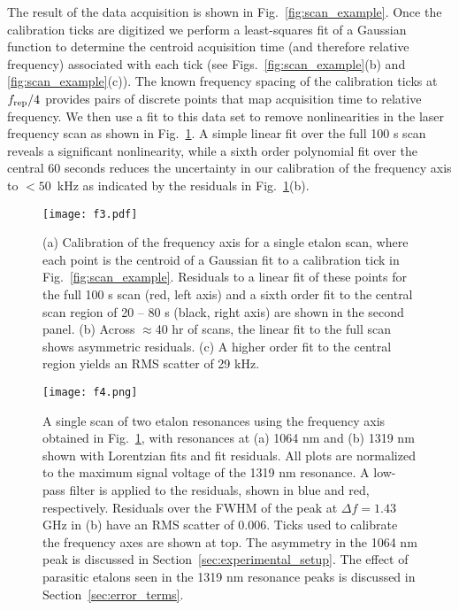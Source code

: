 \documentclass[10pt]{article}
\begin{document}
The result of the data acquisition is shown in Fig.~\ref{fig:scan_example}. Once the calibration ticks are digitized we perform a least-squares fit of a Gaussian function to determine the centroid acquisition time (and therefore relative frequency) associated with each tick (see Figs.~\ref{fig:scan_example}(b) and \ref{fig:scan_example}(c)).  The known frequency spacing of the calibration ticks at $f_{\rm rep}/4$ provides pairs of discrete points that map acquisition time to relative frequency. We then use a fit to this data set to remove nonlinearities in the laser frequency scan as shown in Fig.~\ref{fig:axis_calibration}.  A simple linear fit over the full 100 s scan reveals a significant nonlinearity, while a sixth order polynomial fit over the central 60 seconds reduces the uncertainty in our calibration of the frequency axis to $<50$~kHz as indicated by the residuals in Fig.~\ref{fig:axis_calibration}(b).

\begin{figure}
\texttt{[image: f3.pdf]}
\caption{(a) Calibration of the frequency axis for a single etalon scan, where each point is the centroid of a Gaussian fit to a calibration tick in Fig.~\ref{fig:scan_example}. Residuals to a linear fit of these points for the full 100 s scan (red, left axis) and a sixth order fit to the central scan region of 20 -- 80 s (black, right axis) are shown in the second panel.  (b) Across $\approx$40 hr of scans, the linear fit to the full scan shows asymmetric residuals. 
(c)  A higher order fit to the central region yields an RMS scatter of 29 kHz.} 
\label{fig:axis_calibration}
\end{figure}

\begin{figure}
\texttt{[image: f4.png]}
\caption{A single scan of two etalon resonances using the frequency axis obtained in Fig.~\ref{fig:axis_calibration}, with resonances at (a) 1064 nm and (b) 1319 nm shown with Lorentzian fits and fit residuals. All plots are normalized to the maximum signal voltage of the 1319 nm resonance. A low-pass filter is applied to the residuals, shown in blue and red, respectively. Residuals over the FWHM of the peak at $\Delta f=1.43$ GHz in (b) have an RMS scatter of 0.006. Ticks used to calibrate the frequency axes are shown at top. The asymmetry in the 1064 nm peak is discussed in Section~\ref{sec:experimental_setup}. The effect of parasitic etalons seen in the 1319 nm resonance peaks is discussed in Section~\ref{sec:error_terms}.}
\label{fig:transmission_scan}
\end{figure}
\end{document}
